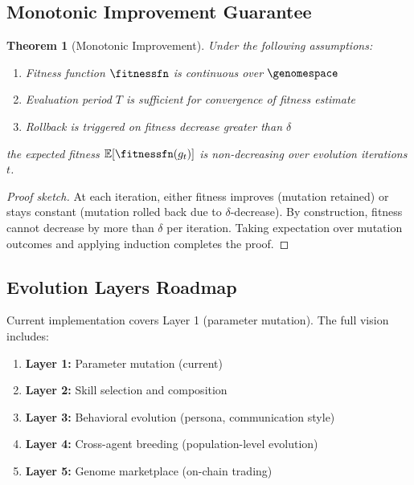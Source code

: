 \documentclass{article}
\newtheorem{theorem}{Theorem}[section]
\begin{document}
\subsection{Monotonic Improvement Guarantee}

\begin{theorem}[Monotonic Improvement]
Under the following assumptions:
\begin{enumerate}
    \item Fitness function $\fitnessfn$ is continuous over $\genomespace$
    \item Evaluation period $T$ is sufficient for convergence of fitness estimate
    \item Rollback is triggered on fitness decrease greater than $\delta$
\end{enumerate}
the expected fitness $\mathbb{E}[\fitnessfn(g_t)]$ is non-decreasing over evolution iterations $t$.
\end{theorem}

\begin{proof}[Proof sketch]
At each iteration, either fitness improves (mutation retained) or stays constant (mutation rolled back due to $\delta$-decrease). By construction, fitness cannot decrease by more than $\delta$ per iteration. Taking expectation over mutation outcomes and applying induction completes the proof.
\end{proof}

\subsection{Evolution Layers Roadmap}

Current implementation covers Layer 1 (parameter mutation). The full vision includes:

\begin{enumerate}[leftmargin=*]
    \item \textbf{Layer 1:} Parameter mutation (current)
    \item \textbf{Layer 2:} Skill selection and composition
    \item \textbf{Layer 3:} Behavioral evolution (persona, communication style)
    \item \textbf{Layer 4:} Cross-agent breeding (population-level evolution)
    \item \textbf{Layer 5:} Genome marketplace (on-chain trading)
\end{enumerate}


\end{document}
